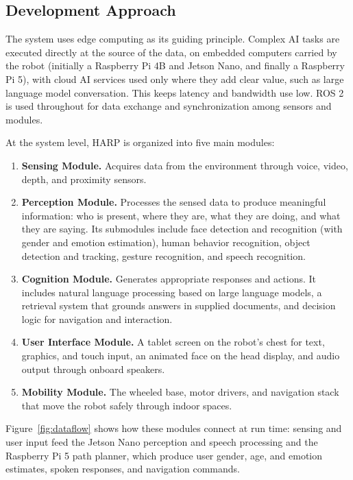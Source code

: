\documentclass[11pt,a4paper]{article}
\begin{document}
\subsection{Development Approach}

The system uses edge computing as its guiding principle. Complex AI tasks are executed directly at the source of the data, on embedded computers carried by the robot (initially a Raspberry Pi 4B and Jetson Nano, and finally a Raspberry Pi 5), with cloud AI services used only where they add clear value, such as large language model conversation. This keeps latency and bandwidth use low. ROS 2 is used throughout for data exchange and synchronization among sensors and modules.

At the system level, HARP is organized into five main modules:

\begin{enumerate}
\item \textbf{Sensing Module.} Acquires data from the environment through voice, video, depth, and proximity sensors.
\item \textbf{Perception Module.} Processes the sensed data to produce meaningful information: who is present, where they are, what they are doing, and what they are saying. Its submodules include face detection and recognition (with gender and emotion estimation), human behavior recognition, object detection and tracking, gesture recognition, and speech recognition.
\item \textbf{Cognition Module.} Generates appropriate responses and actions. It includes natural language processing based on large language models, a retrieval system that grounds answers in supplied documents, and decision logic for navigation and interaction.
\item \textbf{User Interface Module.} A tablet screen on the robot's chest for text, graphics, and touch input, an animated face on the head display, and audio output through onboard speakers.
\item \textbf{Mobility Module.} The wheeled base, motor drivers, and navigation stack that move the robot safely through indoor spaces.
\end{enumerate}

Figure~\ref{fig:dataflow} shows how these modules connect at run time: sensing and user input feed the Jetson Nano perception and speech processing and the Raspberry Pi 5 path planner, which produce user gender, age, and emotion estimates, spoken responses, and navigation commands.
\end{document}
